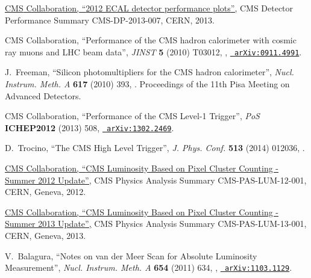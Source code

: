 \documentclass[12pt]{thesis}  %
\begin{document}
\begin{thebibliography}{100}
\href {https://cds.cern.ch/record/1528235} {{ CMS} Collaboration, ``{2012 ECAL
  detector performance plots}'',} CMS Detector Performance Summary
  CMS-DP-2013-007, CERN, 2013.

\hrefCMSnoop {} {{ CMS} Collaboration, ``Performance of the CMS hadron
  calorimeter with cosmic ray muons and LHC beam data'',} \textit{ JINST}
  \textbf{ 5} (2010) T03012,
  \href{http://dx.doi.org/10.1088/1748-0221/5/03/T03012}{},
  \href{http://www.arXiv.org/abs/0911.4991}{\texttt{ arXiv:0911.4991}}.

\hrefCMSnoop {} {J.~Freeman, ``Silicon photomultipliers for the CMS hadron
  calorimeter'',} \textit{ Nucl. Instrum. Meth. A} \textbf{ 617} (2010) 393,
  \href{http://dx.doi.org/10.1016/j.nima.2009.10.132}{}.
  Proceedings of the 11th Pisa Meeting on Advanced Detectors.

\hrefCMSnoop {} {{ CMS} Collaboration, ``{Performance of the CMS Level-1
  Trigger}'',} \textit{ PoS} \textbf{ ICHEP2012} (2013) 508,
\href{http://www.arXiv.org/abs/1302.2469}{\texttt{ arXiv:1302.2469}}.

\hrefCMSnoop {} {D.~Trocino, ``{The CMS High Level Trigger}'',} \textit{ J.
  Phys. Conf.} \textbf{ 513} (2014) 012036,
\href{http://dx.doi.org/10.1088/1742-6596/513/1/012036}{}.

\href {https://cds.cern.ch/record/1482193} {{ CMS} Collaboration, ``{CMS
  Luminosity Based on Pixel Cluster Counting - Summer 2012 Update}'',} CMS
  Physics Analysis Summary CMS-PAS-LUM-12-001, CERN, Geneva, 2012.

\href {https://cds.cern.ch/record/1598864} {{ CMS} Collaboration, ``{CMS
  Luminosity Based on Pixel Cluster Counting - Summer 2013 Update}'',} CMS
  Physics Analysis Summary CMS-PAS-LUM-13-001, CERN, Geneva, 2013.

\hrefCMSnoop {} {V.~Balagura, ``{Notes on van der Meer Scan for Absolute
  Luminosity Measurement}'',} \textit{ Nucl. Instrum. Meth. A} \textbf{ 654}
  (2011) 634,
  \href{http://dx.doi.org/10.1016/j.nima.2011.06.007}{},
\href{http://www.arXiv.org/abs/1103.1129}{\texttt{ arXiv:1103.1129}}.


\end{thebibliography}
\end{document}
